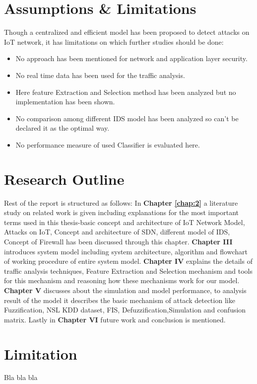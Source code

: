 \section{Assumptions \& Limitations}
Though a centralized and efficient model has been proposed to detect attacks on IoT network, it has limitations on which further studies should be done:
\begin{itemize}
    \item No approach has been mentioned for network and application layer security.
    \item No real time data has been used for the traffic analysis.
    \item Here feature Extraction and Selection method has been analyzed but no implementation has been shown.
    \item No comparison among different IDS model has been analyzed so can’t be declared it as the optimal way. 
    \item No performance measure of used Classifier is evaluated here.
\end{itemize}

\section{Research Outline}
Rest of the report is structured as follows: In \textbf{Chapter \ref{chap:2}} a literature study on related work is given including explanations for the most important terms used in this thesis-basic concept and architecture of IoT Network Model, Attacks on IoT, Concept and architecture of SDN, different model of IDS, Concept of Firewall has been discussed through this chapter. \textbf{Chapter III}  introduces system model including system architecture, algorithm and flowchart of working procedure of entire system model. \textbf{Chapter IV} explains the details of traffic analysis techniques, Feature Extraction and Selection mechanism and tools for this mechanism and reasoning how these mechanisms work for our model. \textbf{Chapter V} discusses about the simulation and model performance, to analysis result of the model it describes the basic mechanism of attack detection like Fuzzification, NSL KDD dataset, FIS, Defuzzification,Simulation and confusion matrix. Lastly in \textbf{Chapter VI} future work and conclusion is mentioned. 

\section{Limitation}
Bla bla bla
\label{sec:EffSearch} 

